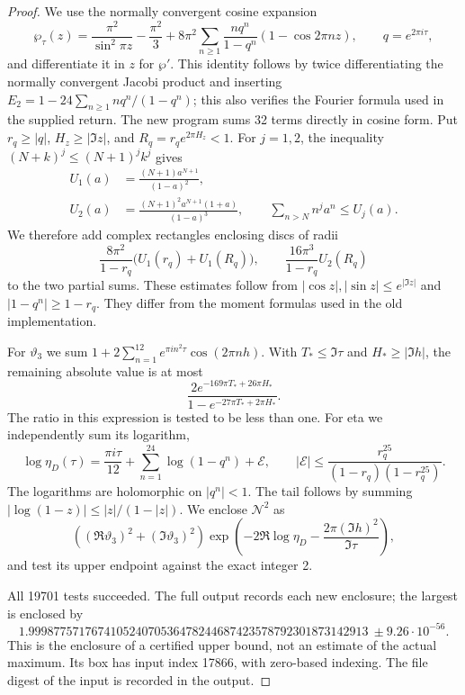 \begin{proof}
We use the normally convergent cosine expansion
\[
 \wp_\tau(z)=\frac{\pi^2}{\sin^2\pi z}-\frac{\pi^2}{3}
 +8\pi^2\sum_{n\geq1}\frac{nq^n}{1-q^n}
                      (1-\cos 2\pi nz),\qquad q=e^{2\pi i\tau},
\]
and differentiate it in $z$ for $\wp'$. This identity follows by twice
differentiating the normally convergent Jacobi product and inserting
$E_2=1-24\sum_{n\geq1}nq^n/(1-q^n)$; this also verifies the
Fourier formula used in the supplied return. The new program sums
32 terms directly in cosine form. Put $r_q\geq|q|$,
$H_z\geq|\Im z|$, and $R_q=r_q e^{2\pi H_z}<1$.
For $j=1,2$, the inequality $(N+k)^j\leq(N+1)^jk^j$ gives
\[
 \begin{aligned}
 U_1(a)&=\frac{(N+1)a^{N+1}}{(1-a)^2},\\
 U_2(a)&=\frac{(N+1)^2a^{N+1}(1+a)}{(1-a)^3},
 \qquad
 \sum_{n>N}n^j a^n\leq U_j(a).
 \end{aligned}
\]
We therefore add complex rectangles enclosing discs of radii
\[
 \frac{8\pi^2}{1-r_q}\bigl(U_1(r_q)+U_1(R_q)\bigr),
 \qquad \frac{16\pi^3}{1-r_q}U_2(R_q)
\]
to the two partial sums. These estimates follow from
$|\cos z|,|\sin z|\leq e^{|\Im z|}$ and
$|1-q^n|\geq1-r_q$. They differ from the moment formulas used in
the old implementation.

For $\vartheta_3$ we sum
$1+2\sum_{n=1}^{12}e^{\pi i n^2\tau}\cos(2\pi nh)$.
With $T_*\leq\Im\tau$ and $H_*\geq|\Im h|$, the remaining
absolute value is at most
\[
 \frac{2e^{-169\pi T_*+26\pi H_*}}
 {1-e^{-27\pi T_*+2\pi H_*}}.
\]
The ratio in this expression is tested to be less than one. For eta
we independently sum its logarithm,
\[
 \log\eta_D(\tau)=\frac{\pi i\tau}{12}
          +\sum_{n=1}^{24}\log(1-q^n)+\mathcal E,
 \qquad
 |\mathcal E|\leq
 \frac{r_q^{25}}{(1-r_q)(1-r_q^{25})}.
\]
The logarithms are holomorphic on $|q^n|<1$. The tail follows by
summing $|\log(1-z)|\leq|z|/(1-|z|)$.
We enclose $\mathcal N^2$ as
\[
 ((\Re\vartheta_3)^2+(\Im\vartheta_3)^2)
 \exp\left(-2\Re\log\eta_D-
                   \frac{2\pi(\Im h)^2}{\Im\tau}\right),
\]
and test its upper endpoint against the exact integer 2.

All 19701 tests succeeded. The full output records each new enclosure;
the largest is enclosed by
\[
 1.999877571767410524070536478244687423578792301873142913
       \ \pm 9.26\cdot10^{-56}.
\]
This is the enclosure of a certified upper bound, not an estimate of
the actual maximum. Its box has input index 17866, with zero-based
indexing. The file digest of the input is recorded in the output.


\end{proof}
